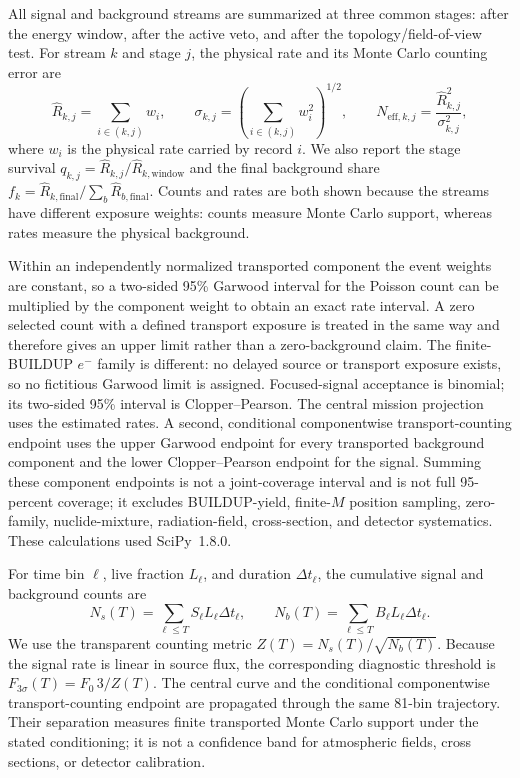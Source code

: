 \documentclass[11pt]{article}
\begin{document}
All signal and background streams are summarized at three common stages: after the
energy window, after the active veto, and after the topology/field-of-view test. For
stream $k$ and stage $j$, the physical rate and its Monte Carlo counting error are
\begin{equation}
  \widehat R_{k,j}=\sum_{i\in(k,j)} w_i,
  \qquad
  \sigma_{k,j}=\left(\sum_{i\in(k,j)} w_i^2\right)^{1/2},
  \qquad
  N_{\mathrm{eff},k,j}=\frac{\widehat R_{k,j}^{2}}{\sigma_{k,j}^{2}},
  \label{eq:weighted_rate_stats}
\end{equation}
where $w_i$ is the physical rate carried by record $i$. We also report the stage
survival $q_{k,j}=\widehat R_{k,j}/\widehat R_{k,\mathrm{window}}$ and the final
background share $f_k=\widehat R_{k,\mathrm{final}}/\sum_b
\widehat R_{b,\mathrm{final}}$. Counts and rates are both shown because the streams
have different exposure weights: counts measure Monte Carlo support, whereas rates
measure the physical background.

Within an independently normalized transported component the event weights are
constant, so a two-sided 95\% Garwood interval for the Poisson count can be
multiplied by the component weight to obtain an exact rate interval. A zero
selected count with a defined transport exposure is treated in the same way and
therefore gives an upper limit rather than a zero-background claim. The finite-
BUILDUP $e^-$ family is different: no delayed source or transport exposure exists,
so no fictitious Garwood limit is assigned. Focused-signal acceptance is binomial;
its two-sided 95\% interval is Clopper--Pearson. The central mission projection
uses the estimated rates. A second, conditional componentwise transport-counting
endpoint uses the upper Garwood endpoint for every transported background
component and the lower Clopper--Pearson endpoint for the signal. Summing these
component endpoints is not a joint-coverage interval and is not full 95-percent
coverage; it excludes BUILDUP-yield, finite-$M$ position sampling,
zero-family, nuclide-mixture, radiation-field, cross-section, and detector
systematics. These calculations used SciPy~1.8.0.

For time bin $\ell$, live fraction $L_\ell$, and duration $\Delta t_\ell$, the
cumulative signal and background counts are
\begin{equation}
 N_s(T)=\sum_{\ell\leq T} S_\ell L_\ell\Delta t_\ell,
 \qquad
 N_b(T)=\sum_{\ell\leq T} B_\ell L_\ell\Delta t_\ell.
 \label{eq:cumulative_counts}
\end{equation}
We use the transparent counting metric $Z(T)=N_s(T)/\sqrt{N_b(T)}$. Because the
signal rate is linear in source flux, the corresponding diagnostic threshold is
$F_{3\sigma}(T)=F_0\,3/Z(T)$. The central curve and the conditional componentwise
transport-counting endpoint are propagated through the same 81-bin trajectory.
Their separation measures finite transported Monte Carlo support under the stated
conditioning; it is not a confidence band for atmospheric fields, cross sections,
or detector calibration.
\end{document}

